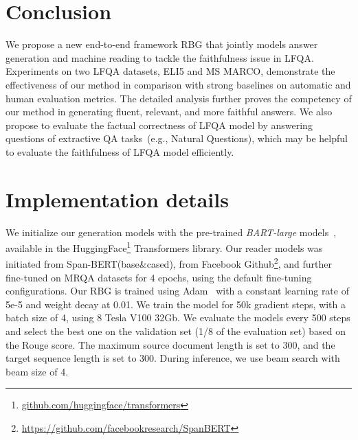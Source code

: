 \documentclass[11pt]{article}
\begin{document}
\vspace{-5pt}
\section{Conclusion}
\vspace{-5pt}
We propose a new end-to-end framework RBG that jointly models answer generation and machine reading to tackle the faithfulness issue in LFQA. Experiments on two LFQA datasets, ELI5 and MS MARCO, demonstrate the effectiveness of our method in comparison with strong baselines on automatic and human evaluation metrics. The detailed analysis further proves the competency of our method in generating fluent, relevant, and more faithful answers. We also propose to evaluate the factual correctness of LFQA model by answering questions of extractive QA tasks~(e.g., Natural Questions), which may be helpful to evaluate the faithfulness of LFQA model efficiently.




















\normalem





\appendix

\section{Implementation details}
\label{appendix:xxx}

We initialize our generation models with the pre-trained \textit{BART-large} models~\cite{lewis2020bart}, available
in the HuggingFace\footnote{\url{github.com/huggingface/transformers}} Transformers library. Our reader models was initiated from Span-BERT(base\&cased), from Facebook Github\footnote{\url{https://github.com/facebookresearch/SpanBERT}}, and further fine-tuned on MRQA datasets for 4 epochs, using the default fine-tuning configurations. Our RBG is trained using Adam~\cite{kingma2014adam} with a constant learning rate of 5e-5 and weight decay at 0.01. We train the model for 50k gradient steps, with a batch size of 4, using 8 Tesla V100 32Gb. We evaluate the models every 500 steps and select the best one on the validation set (1/8 of the evaluation set) based on the Rouge score. The maximum source document length is set to 300, and the target sequence length is set to 300. During inference, we use beam search with beam size of 4.
\end{document}
